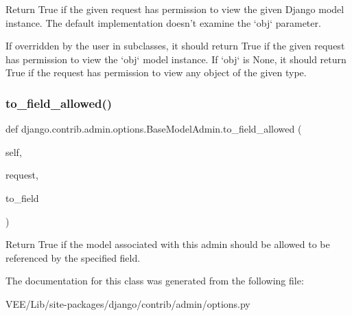 \begin{DoxyVerb}Return True if the given request has permission to view the given
Django model instance. The default implementation doesn't examine the
`obj` parameter.

If overridden by the user in subclasses, it should return True if the
given request has permission to view the `obj` model instance. If `obj`
is None, it should return True if the request has permission to view
any object of the given type.
\end{DoxyVerb}
 \mbox{\label{classdjango_1_1contrib_1_1admin_1_1options_1_1_base_model_admin_ae6a1e3290f8ce532ceaf8eafb4215bd3}} 
\subsubsection{\texorpdfstring{to\+\_\+field\+\_\+allowed()}{to\_field\_allowed()}}
{\footnotesize\ttfamily def django.\+contrib.\+admin.\+options.\+Base\+Model\+Admin.\+to\+\_\+field\+\_\+allowed (\begin{DoxyParamCaption}\item[{}]{self,  }\item[{}]{request,  }\item[{}]{to\+\_\+field }\end{DoxyParamCaption})}

\begin{DoxyVerb}Return True if the model associated with this admin should be
allowed to be referenced by the specified field.
\end{DoxyVerb}
 

The documentation for this class was generated from the following file\+:\begin{DoxyCompactItemize}
\item 
V\+E\+E/\+Lib/site-\/packages/django/contrib/admin/options.\+py\end{DoxyCompactItemize}
